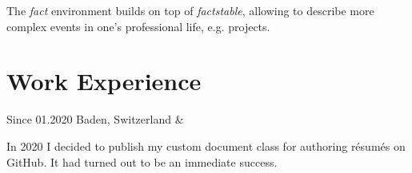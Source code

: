 \documentclass{resume}
\begin{document}
  The \emph{fact} environment builds on top of \emph{factstable}, allowing to
  describe more complex events in one's professional life, e.g. projects.

 \section{Work Experience}

  \begin{factstable}
   Since 01.2020 \newline
   Baden, Switzerland
   &
    \begin{fact}
     In 2020 I decided to publish my custom document class for authoring résumés
     on GitHub. It had turned out to be an immediate success.
    \end{fact}
   \\
  \end{factstable}
\end{document}
